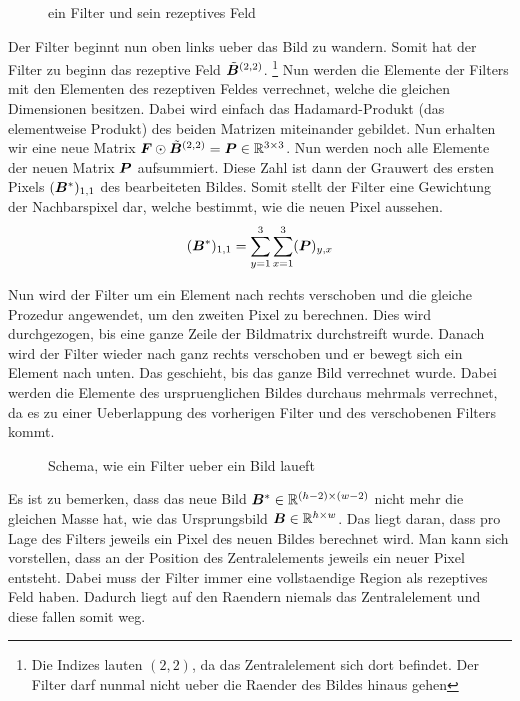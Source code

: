 \documentclass[../main]{subfiles}
\begin{document}
\begin{figure}[h!]

  \caption{ein Filter und sein rezeptives Feld}
  \label{fig:receptive_field}
\end{figure}

\para{}
Der Filter beginnt nun oben links ueber das Bild zu wandern. Somit
hat der Filter zu beginn das rezeptive Feld $\tilde{\bm{B}}^{(2,2)}$.
\footnote{Die Indizes lauten $(2,2)$, da das Zentralelement sich dort befindet.
  Der Filter darf nunmal nicht ueber die Raender des Bildes hinaus gehen}
Nun werden die Elemente der Filters mit den Elementen des rezeptiven Feldes
verrechnet, welche die gleichen Dimensionen besitzen. Dabei wird einfach das
Hadamard-Produkt (das elementweise Produkt) des beiden Matrizen miteinander
gebildet. Nun erhalten wir eine neue Matrix $\bm{F} \odot
\tilde{\bm{B}}^{(2,2)} = \bm{P} \in \mathbb{R}^{3 \times 3}$.
Nun werden noch alle Elemente der neuen Matrix $\bm{P}$
aufsummiert. Diese Zahl ist dann der Grauwert des ersten Pixels $(\bm{B}^*)_{1,1}$ des bearbeiteten
Bildes. Somit stellt der Filter eine Gewichtung der Nachbarspixel dar, welche
bestimmt, wie die neuen Pixel aussehen.
\begin{equation*}
  (\bm{B}^*)_{1,1} = \sum_{y=1}^3 \sum_{x=1}^3 (\bm{P})_{y,x}
\end{equation*}

Nun wird der Filter um ein Element nach rechts verschoben und die gleiche
Prozedur angewendet, um den zweiten Pixel zu berechnen. Dies
wird durchgezogen, bis eine ganze Zeile der Bildmatrix durchstreift wurde.
Danach wird der Filter wieder nach ganz rechts verschoben und er bewegt sich ein
Element nach unten. Das geschieht, bis das ganze Bild verrechnet wurde.
Dabei werden die Elemente des urspruenglichen Bildes durchaus mehrmals
verrechnet, da es zu einer Ueberlappung des vorherigen Filter und des
verschobenen Filters kommt.

\begin{figure}[h!]

  \caption{Schema, wie ein Filter ueber ein Bild laueft}
\end{figure}

Es ist zu bemerken, dass das neue Bild $\bm{B}^* \in \mathbb{R}^{(h-2) \times (w-2)}$ nicht mehr die gleichen Masse
hat, wie das Ursprungsbild $\bm{B} \in \mathbb{R}^{h \times w}$. Das liegt daran, dass pro
Lage des Filters jeweils ein Pixel des neuen Bildes berechnet wird. Man kann
sich vorstellen, dass an der Position des Zentralelements jeweils ein neuer
Pixel entsteht. Dabei muss der Filter immer eine vollstaendige Region als
rezeptives Feld haben. Dadurch liegt auf den Raendern niemals das Zentralelement
und diese fallen somit weg.
\para{}
\cite{deeplearning.ai:cnn}
\cite{wiki:convolution}
\end{document}
